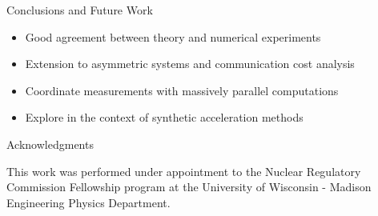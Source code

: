 \documentclass{beamer}
\begin{document}
\begin{frame}{Conclusions and Future Work}

  \begin{itemize}
  \item Good agreement between theory and numerical experiments
    \bigskip
  \item Extension to asymmetric systems and communication cost analysis
    \bigskip
  \item Coordinate measurements with massively parallel computations
    \bigskip
  \item Explore in the context of synthetic acceleration methods
  \end{itemize}

\end{frame}

\begin{frame}{Acknowledgments}

This work was performed under appointment to the Nuclear Regulatory
Commission Fellowship program at the University of Wisconsin - Madison
Engineering Physics Department.

\end{frame}

\end{document}
